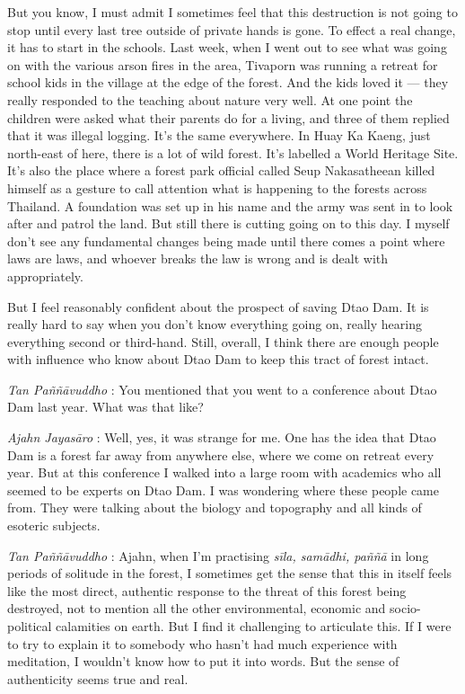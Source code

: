 But you know, I must admit I sometimes feel that this destruction is not
going to stop until every last tree outside of private hands is gone. To
effect a real change, it has to start in the schools. Last week, when I
went out to see what was going on with the various arson fires in the
area, Tivaporn was running a retreat for school kids in the village at
the edge of the forest. And the kids loved it --- they really responded
to the teaching about nature very well. At one point the children were
asked what their parents do for a living, and three of them replied that
it was illegal logging. It's the same everywhere. In Huay Ka Kaeng, just
north-east of here, there is a lot of wild forest. It's labelled a World
Heritage Site. It's also the place where a forest park official called
Seup Nakasatheean killed himself as a gesture to call attention what is
happening to the forests across Thailand. A foundation was set up in his
name and the army was sent in to look after and patrol the land. But
still there is cutting going on to this day. I myself don't see any
fundamental changes being made until there comes a point where laws are
laws, and whoever breaks the law is wrong and is dealt with
appropriately.

But I feel reasonably confident about the prospect of saving Dtao Dam.
It is really hard to say when you don't know everything going on, really
hearing everything second or third-hand. Still, overall, I think there
are enough people with influence who know about Dtao Dam to keep this
tract of forest intact.

\emph{Tan Paññāvuddho} : You mentioned that you went to a conference
about Dtao Dam last year. What was that like?

\emph{Ajahn Jayasāro }: Well, yes, it was strange for me. One has the
idea that Dtao Dam is a forest far away from anywhere else, where we
come on retreat every year. But at this conference I walked into a large
room with academics who all seemed to be experts on Dtao Dam. I was
wondering where these people came from. They were talking about the
biology and topography and all kinds of esoteric subjects.

\emph{Tan Paññāvuddho} : Ajahn, when I'm practising \emph{sīla, samādhi,
paññā} in long periods of solitude in the forest, I sometimes get the
sense that this in itself feels like the most direct, authentic response
to the threat of this forest being destroyed, not to mention all the
other environmental, economic and socio-political calamities on earth.
But I find it challenging to articulate this. If I were to try to
explain it to somebody who hasn't had much experience with meditation, I
wouldn't know how to put it into words. But the sense of authenticity
seems true and real.

